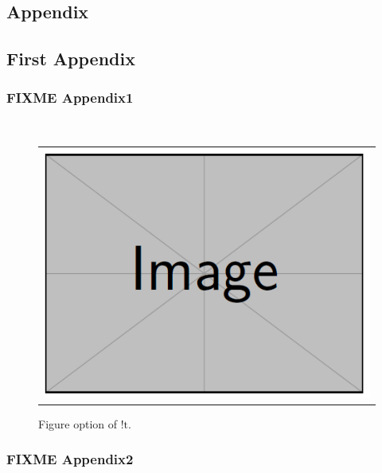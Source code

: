 \documentclass[doctor]{snuee}
\begin{document}
\begin{appendices}
\chapter*{Appendix}
\renewcommand{\thesection}{\Alph{section}}

\section{First Appendix}
\subsection{FIXME Appendix1}
\lipsum[1-2]~\cite{anderson1964hard}
\begin{figure}[!t]
	{
	\begin{center}
		\begin{tabular}{c}
			\includegraphics[width=0.9\linewidth]{dummy.png}
		\end{tabular}
	\end{center}
	}
	\caption[dummy image FIXME A1]{Figure option of $!\text{t}$.}
\label{dummy_imgA1}
\end{figure}
\subsection{FIXME Appendix2}
\lipsum[1-2]~\cite{anderson1964hard}

\end{appendices}
\end{document}
